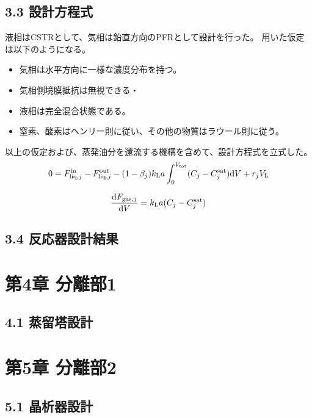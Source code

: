 \documentclass[a4j]{jsarticle}
\begin{document}
\section*{3.3 設計方程式}
液相はCSTRとして、気相は鉛直方向のPFRとして設計を行った。
用いた仮定は以下のようになる。
\begin{itemize} 
    \item 気相は水平方向に一様な濃度分布を持つ。\\
    \item 気相側境膜抵抗は無視できる・\\
    \item 液相は完全混合状態である。\\
    \item 窒素、酸素はヘンリー則に従い、その他の物質はラウール則に従う。
\end{itemize}
以上の仮定および、蒸発油分を還流する機構を含めて、設計方程式を立式した。\\
\begin{equation}\nonumber
    0=F^{{\rm in}}_{{\rm liq},j}-F^{{\rm out}}_{{\rm liq},j} -(1-\beta_j) k_{{\rm L}}a
    \int^{V_{{\rm tot}}}_0(C_j - C^{{\rm sat}}_j){\rm d}V + r_j V_{{\rm L}}
\end{equation}

\begin{equation}\nonumber                                                
    \frac{{\rm d}F_{{\rm gas},j}}{{\rm d}V} = k_{{\rm L}}a(C_j - C^{{\rm sat}}_j)
\end{equation}

\section*{3.4 反応器設計結果} 


\chapter*{第4章 分離部1}
\section*{4.1 蒸留塔設計}


\chapter*{第5章 分離部2}

\section*{5.1 晶析器設計}
\end{document}
